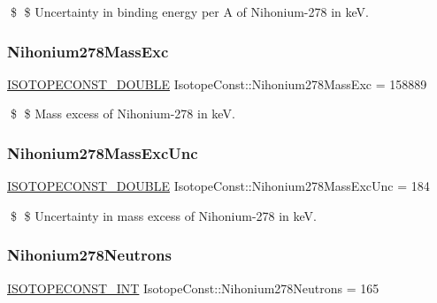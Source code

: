 \$ \$ Uncertainty in binding energy per A of Nihonium-\/278 in keV. \mbox{\label{group___isotope_const-_nihonium-_nh278_gae0210e6270cc48bc9deb4ff2d90a33a4}} 
\subsubsection{\texorpdfstring{Nihonium278\+Mass\+Exc}{Nihonium278MassExc}}
{\footnotesize\ttfamily \mbox{\hyperlink{group___isotope_const-_macros_ga8f45a7272ce02c0b4c65c44636ed719a}{I\+S\+O\+T\+O\+P\+E\+C\+O\+N\+S\+T\+\_\+\+D\+O\+U\+B\+LE}} Isotope\+Const\+::\+Nihonium278\+Mass\+Exc = 158889}

\$ \$ Mass excess of Nihonium-\/278 in keV. \mbox{\label{group___isotope_const-_nihonium-_nh278_ga10d2cea54d2dd787f96848956d5018dd}} 
\subsubsection{\texorpdfstring{Nihonium278\+Mass\+Exc\+Unc}{Nihonium278MassExcUnc}}
{\footnotesize\ttfamily \mbox{\hyperlink{group___isotope_const-_macros_ga8f45a7272ce02c0b4c65c44636ed719a}{I\+S\+O\+T\+O\+P\+E\+C\+O\+N\+S\+T\+\_\+\+D\+O\+U\+B\+LE}} Isotope\+Const\+::\+Nihonium278\+Mass\+Exc\+Unc = 184}

\$ \$ Uncertainty in mass excess of Nihonium-\/278 in keV. \mbox{\label{group___isotope_const-_nihonium-_nh278_ga0fb33a52477123bb47352d2570fa5dc4}} 
\subsubsection{\texorpdfstring{Nihonium278\+Neutrons}{Nihonium278Neutrons}}
{\footnotesize\ttfamily \mbox{\hyperlink{group___isotope_const-_macros_ga5f18360b3e99483a35c32d789e62621c}{I\+S\+O\+T\+O\+P\+E\+C\+O\+N\+S\+T\+\_\+\+I\+NT}} Isotope\+Const\+::\+Nihonium278\+Neutrons = 165}

